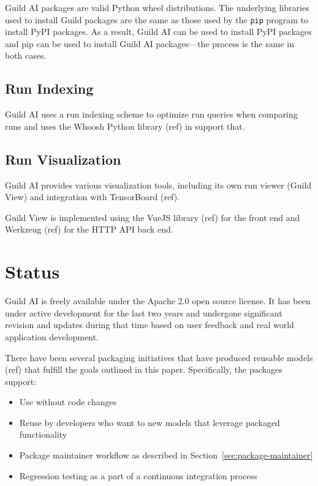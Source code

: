 \documentclass{article}
\begin{document}
Guild AI packages are valid Python wheel distributions. The underlying
libraries used to install Guild packages are the same as those used by
the \verb|pip| program to install PyPI packages. As a result, Guild
AI can be used to install PyPI packages and pip can be used to install
Guild AI packages---the process is the same in both cases.

\subsection{Run Indexing}

Guild AI uses a run indexing scheme to optimize run queries when
comparing runs and uses the Whoosh Python library (ref) in support
that.

\subsection{Run Visualization}

Guild AI provides various visualization tools, including its own run
viewer (Guild View) and integration with TensorBoard (ref).

Guild View is implemented using the VueJS library (ref) for the front
end and Werkzeug (ref) for the HTTP API back end.

\section{Status}

Guild AI is freely available under the Apache 2.0 open source
license. It has been under active development for the last two years
and undergone significant revision and updates during that time based
on user feedback and real world application development.

There have been several packaging initiatives that have produced
reusable models (ref) that fulfill the goals outlined in this
paper. Specifically, the packages support:

\begin{itemize}
\item Use without code changes
\item Reuse by developers who want to new models that leverage
  packaged functionality
\item Package maintainer workflow as described in
  Section~\ref{sec:package-maintainer}
\item Regression testing as a part of a continuous integration process
\end{itemize}



\end{document}
